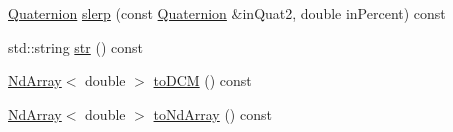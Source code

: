 \begin{DoxyCompactItemize}
\item 
\mbox{\hyperlink{class_num_cpp_1_1_rotations_1_1_quaternion}{Quaternion}} \mbox{\hyperlink{class_num_cpp_1_1_rotations_1_1_quaternion_acd927fb42ea5b0a8c2a397e493dedf3f}{slerp}} (const \mbox{\hyperlink{class_num_cpp_1_1_rotations_1_1_quaternion}{Quaternion}} \&in\+Quat2, double in\+Percent) const
\item 
std\+::string \mbox{\hyperlink{class_num_cpp_1_1_rotations_1_1_quaternion_a363faa78c121cf2b78784e7b2e49e998}{str}} () const
\item 
\mbox{\hyperlink{class_num_cpp_1_1_nd_array}{Nd\+Array}}$<$ double $>$ \mbox{\hyperlink{class_num_cpp_1_1_rotations_1_1_quaternion_acb7afe46d4731a28053b68b3fdeec583}{to\+D\+CM}} () const
\item 
\mbox{\hyperlink{class_num_cpp_1_1_nd_array}{Nd\+Array}}$<$ double $>$ \mbox{\hyperlink{class_num_cpp_1_1_rotations_1_1_quaternion_acd8bcd58737b24eb3a36962c455a0d48}{to\+Nd\+Array}} () const
\end{DoxyCompactItemize}
